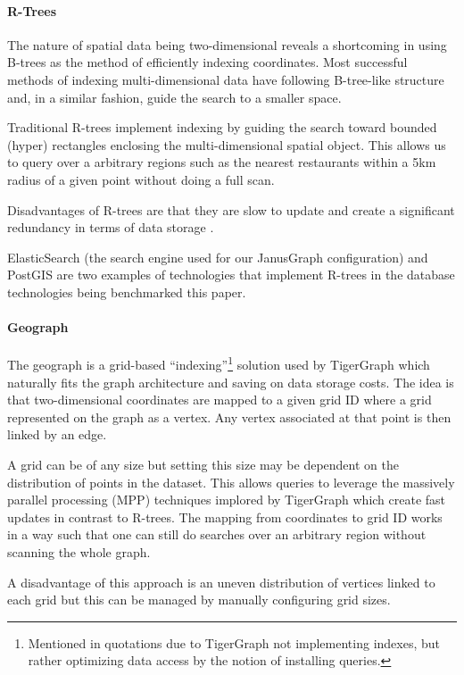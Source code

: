 \paragraph{R-Trees}

The nature of spatial data being two-dimensional reveals a shortcoming in using B-trees as the method of efficiently indexing coordinates. Most successful methods of indexing multi-dimensional data have following B-tree-like structure \cite{rtree} and, in a similar fashion, guide the search to a smaller space.

Traditional R-trees implement indexing by guiding the search toward bounded (hyper) rectangles enclosing the multi-dimensional spatial object. This allows us to query over a arbitrary regions such as the nearest restaurants within a 5km radius of a given point without doing a full scan.

Disadvantages of R-trees are that they are slow to update and create a significant redundancy in terms of data storage \cite{graphgurus}.

ElasticSearch (the search engine used for our JanusGraph configuration) and PostGIS are two examples of technologies that implement R-trees in the database technologies being benchmarked this paper.

\paragraph{Geograph}

The geograph is a grid-based ``indexing''\footnote{Mentioned in quotations due to TigerGraph not implementing indexes, but rather optimizing data access by the notion of installing queries.} solution used by TigerGraph which naturally fits the graph architecture and saving on data storage costs. The idea is that two-dimensional coordinates are mapped to a given grid ID where a grid represented on the graph as a vertex. Any vertex associated at that point is then linked by an edge.

A grid can be of any size but setting this size may be dependent on the distribution of points in the dataset. This allows queries to leverage the massively parallel processing (MPP) techniques implored by TigerGraph which create fast updates in contrast to R-trees. The mapping from coordinates to grid ID works in a way such that one can still do searches over an arbitrary region without scanning the whole graph.

A disadvantage of this approach is an uneven distribution of vertices linked to each grid but this can be managed by manually configuring grid sizes.

